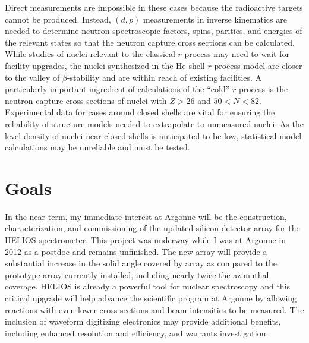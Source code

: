 Direct measurements are impossible in these cases because  the radioactive targets cannot be produced. Instead, $(d,p)$ measurements in inverse kinematics are needed to determine neutron spectroscopic factors, spins, parities, and energies of the relevant states so that the neutron capture cross sections can be calculated.
While studies of nuclei relevant to the classical $r$-process may need to wait for facility upgrades, the nuclei synthesized in the He shell $r$-process model %
are closer to the valley of $\beta$-stability %
and are %
within reach %
of existing facilities.
A particularly important ingredient of calculations of the ``cold'' $r$-process %
is
the neutron capture cross sections of nuclei with $Z>26$ and $50<N<82$. Experimental data for cases around closed shells are vital for ensuring the reliability of structure models needed to extrapolate to unmeasured nuclei. As the level density of nuclei near closed shells is anticipated to be low, statistical model calculations may be unreliable and must be tested. %

\section*{Goals}


In the near term, my immediate interest at Argonne will be the construction, characterization, and commissioning of the updated silicon detector array for the HELIOS spectrometer.
This project was underway while I was at Argonne in 2012 as a postdoc and remains unfinished. 
The new array will provide a substantial increase in the solid angle covered by array as compared to the prototype array currently installed, including nearly twice the azimuthal coverage. %
HELIOS is already a powerful tool for nuclear spectroscopy and this critical upgrade will help 
advance the scientific program at Argonne by allowing reactions with even lower cross sections and beam intensities to be measured. The inclusion of waveform digitizing electronics may provide additional benefits, including enhanced resolution and efficiency, and warrants investigation.

